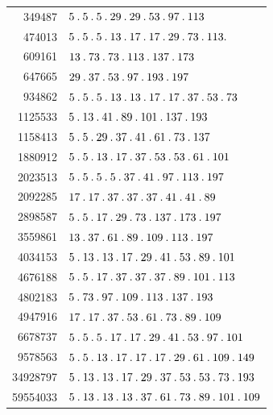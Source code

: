 %
\begingroup\small\setlength{\tabcolsep}{5pt}
\begin{longtable}{@{}r|l@{}}
349487 & $5\pdot 5\pdot 5\pdot 29\pdot 29\pdot 53\pdot 97\pdot 113$\\
474013 & $5\pdot 5\pdot 5\pdot 13\pdot 17\pdot 17\pdot 29\pdot 73\pdot 113\pdot $\\
609161 & $13\pdot 73\pdot 73\pdot 113\pdot 137\pdot 173$\\
647665 & $29\pdot 37\pdot 53\pdot 97\pdot 193\pdot 197$\\
934862 & $5\pdot 5\pdot 5\pdot 13\pdot 13\pdot 17\pdot 17\pdot 37\pdot 53\pdot 73$\\
1125533 & $5\pdot 13\pdot 41\pdot 89\pdot 101\pdot 137\pdot 193$\\
1158413 & $5\pdot 5\pdot 29\pdot 37\pdot 41\pdot 61\pdot 73\pdot 137$\\
1880912 & $5\pdot 5\pdot 13\pdot 17\pdot 37\pdot 53\pdot 53\pdot 61\pdot 101$\\
2023513 & $5\pdot 5\pdot 5\pdot 5\pdot 37\pdot 41\pdot 97\pdot 113\pdot 197$\\
2092285 & $17\pdot 17\pdot 37\pdot 37\pdot 37\pdot 41\pdot 41\pdot 89$\\
2898587 & $5\pdot 5\pdot 17\pdot 29\pdot 73\pdot 137\pdot 173\pdot 197$\\
3559861 & $13\pdot 37\pdot 61\pdot 89\pdot 109\pdot 113\pdot 197$\\
4034153 & $5\pdot 13\pdot 13\pdot 17\pdot 29\pdot 41\pdot 53\pdot 89\pdot 101$\\
4676188 & $5\pdot 5\pdot 17\pdot 37\pdot 37\pdot 37\pdot 89\pdot 101\pdot 113$\\
4802183 & $5\pdot 73\pdot 97\pdot 109\pdot 113\pdot 137\pdot 193$\\
4947916 & $17\pdot 17\pdot 37\pdot 53\pdot 61\pdot 73\pdot 89\pdot 109$\\
6678737 & $5\pdot 5\pdot 5\pdot 17\pdot 17\pdot 29\pdot 41\pdot 53\pdot 97\pdot 101$\\
9578563 & $5\pdot 5\pdot 13\pdot 17\pdot 17\pdot 17\pdot 29\pdot 61\pdot 109\pdot 149$\\
34928797 & $5\pdot 13\pdot 13\pdot 17\pdot 29\pdot 37\pdot 53\pdot 53\pdot 73\pdot 193$\\
59554033 & $5\pdot 13\pdot 13\pdot 13\pdot 37\pdot 61\pdot 73\pdot 89\pdot 101\pdot 109$\\
\end{longtable}\endgroup
\par\medskip\begingroup\small\setlength{\tabcolsep}{5pt}
